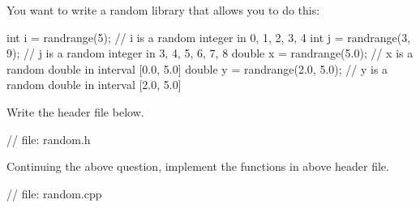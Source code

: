 

\nextq
You want to write a random library that allows you to do this:
\begin{console}[fontsize=\footnotesize]
int i = randrange(5);           // i is a random integer in {0, 1, 2, 3, 4}
int j = randrange(3, 9);        // j is a random integer in {3, 4, 5, 6, 7, 8}
double x = randrange(5.0);      // x is a random double in interval [0.0, 5.0]
double y = randrange(2.0, 5.0); // y is a random double in interval [2.0, 5.0]
\end{console}
Write the header file below.
\\
\ANSWER
\begin{answercode}
// file: random.h

\end{answercode}

\nextq
Continuing the above question, implement the functions in above header file.
\\
\ANSWER
\begin{answercode}
// file: random.cpp

\end{answercode}

